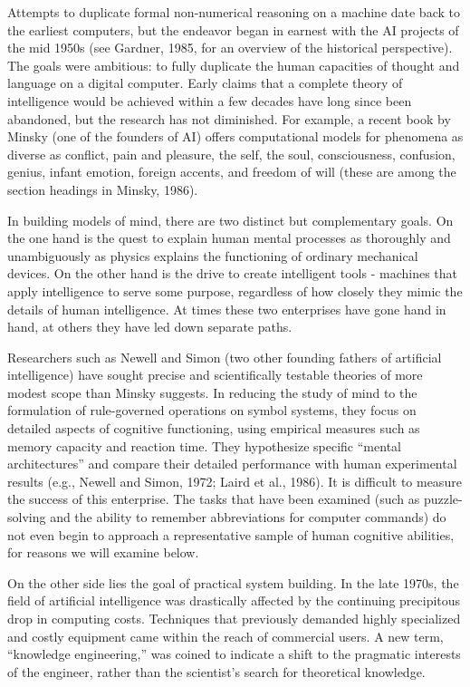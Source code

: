 \documentclass[12pt]{article}
\begin{document}
Attempts to duplicate formal non-numerical reasoning on a machine date back to the earliest computers, but the endeavor began in earnest with the AI projects of the mid 1950s (see Gardner, 1985, for an overview of the historical perspective). The goals were ambitious: to fully duplicate the human capacities of thought and language on a digital computer. Early claims that a complete theory of intelligence would be achieved within a few decades have long since been abandoned, but the research has not diminished. For example, a recent book by Minsky (one of the founders of AI) offers computational models for phenomena as diverse as conflict, pain and pleasure, the self, the soul, consciousness, confusion, genius, infant emotion, foreign accents, and freedom of will (these are among the section headings in Minsky, 1986).

In building models of mind, there are two distinct but complementary goals. On the one hand is the quest to explain human mental processes as thoroughly and unambiguously as physics explains the functioning of ordinary mechanical devices. On the other hand is the drive to create intelligent tools - machines that apply intelligence to serve some purpose, regardless of how closely they mimic the details of human intelligence. At times these two enterprises have gone hand in hand, at others they have led down separate paths.

Researchers such as Newell and Simon (two other founding fathers of artificial intelligence) have sought precise and scientifically testable theories of more modest scope than Minsky suggests. In reducing the study of mind to the formulation of rule-governed operations on symbol systems, they focus on detailed aspects of cognitive functioning, using empirical measures such as memory capacity and reaction time. They hypothesize specific ``mental architectures'' and compare their detailed performance with human experimental results (e.g., Newell and Simon, 1972; Laird et al., 1986). It is difficult to measure the success of this enterprise. The tasks that have been examined (such as puzzle-solving and the ability to remember abbreviations for computer commands) do not even begin to approach a representative sample of human cognitive abilities, for reasons we will examine below.

On the other side lies the goal of practical system building. In the late 1970s, the field of artificial intelligence was drastically affected by the continuing precipitous drop in computing costs. Techniques that previously demanded highly specialized and costly equipment came within the reach of commercial users. A new term, ``knowledge engineering,'' was coined to indicate a shift to the pragmatic interests of the engineer, rather than the scientist’s search for theoretical knowledge.
\end{document}

